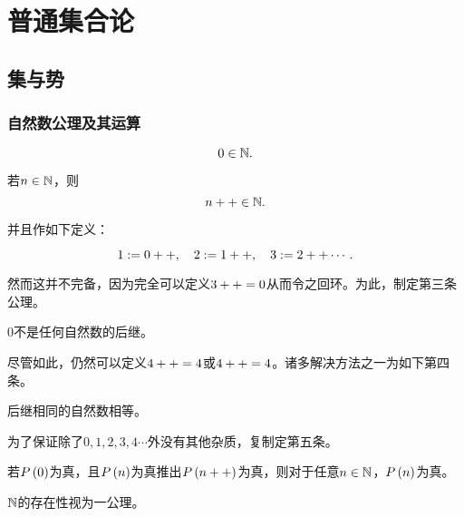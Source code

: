 \documentclass{ctexrep}
\begin{document}
\fi


\chapter{普通集合论}
  \section{集与势}
  \subsection{自然数公理及其运算}
  \begin{axiom}
    \[ 0 \in \mathbb{N}. \]
  \end{axiom}
  \begin{axiom}
    若$n\in \mathbb{N}$，则
    \[ n++\in \mathbb{N}. \]
  \end{axiom}
  并且作如下定义：
  \begin{definition}
    \[ 1 := 0++, \quad 2 := 1++, \quad 3 := 2++\cdots. \]
  \end{definition}
  然而这并不完备，因为完全可以定义$3++=0$从而令之回环。为此，制定第三条公理。
  \begin{axiom}
    $0$不是任何自然数的后继。
  \end{axiom}
  尽管如此，仍然可以定义$4++=4$或$4++=4$。诸多解决方法之一为如下第四条。
  \begin{axiom}
    后继相同的自然数相等。
  \end{axiom}
  为了保证除了$0,1,2,3,4\cdots$外没有其他杂质，复制定第五条。
  \begin{axiom}[数学归纳法]
    若$P\left(0\right)$为真，且$P\left(n\right)$为真推出$P\left(n++\right)$为真，则对于任意$n\in \mathbb{N}$，$P\left(n\right)$为真。
  \end{axiom}
  $\mathbb{N}$的存在性视为一公理。
\end{document}
